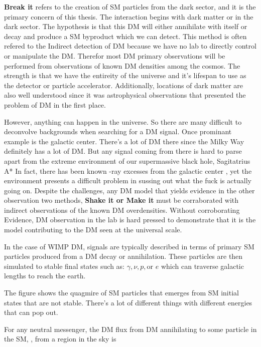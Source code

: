 \textbf{Break it} refers to the creation of SM particles from the dark sector, and it is the primary concern of this thesis.
The interaction begins with dark matter or in the dark sector.
The hypothesis is that this DM will either annihilate with itself or decay and produce a SM byproduct which we can detect.
This method is often refered to the Indirect detection of DM because we have no lab to directly control or manipulate the DM.
Therefor most DM primary observations will be performed from observations of known DM densities among the cosmos.
The strength is that we have the entireity of the universe and it's lifespan to use as the detector or particle accelerator.
Additionally, locations of dark matter are also well understood since it was astrophysical observations that presented the problem of DM in the first place.

However, anything can happen in the universe.
So there are many difficult to deconvolve backgrounds when searching for a DM signal.
Once prominant example is the galactic center.
There's a lot of DM there since the Milky Way definitely has a lot of DM.
But any signal coming from there is hard to parse apart from the extreme environment of our supermassive black hole, Sagitatrius A*
In fact, there has been known \textgamma -ray excesses from the galactic center \ns, yet the environment presents a difficult problem in sussing out what the fuck is actually going on.
Despite the challenges, any DM model that yields evidence in the other observation two methods, \textbf{Shake it or Make it} must be corraborated with indirect observations of the known DM overdensities.
Without corroborating Evidence, DM observation in the lab is hard pressed to demonstrate that it is the model contributing to the DM seen at the universal scale.

In the case of WIMP DM, signals are typically described in terms of primary SM particles produced from a DM decay or annihilation.
These particles are then simulated to stable final states such as: $\gamma, \nu, p, \text{or } e$ which can traverse galactic lengths to reach the earth.


The figure shows the quagmire of SM particles that emerges from SM initial states that are not stable.
There's a lot of different things with different energies that can pop out.

For any neutral messenger, the DM flux from DM annihilating to some particle in the SM, \textphi, from a region in the sky is

